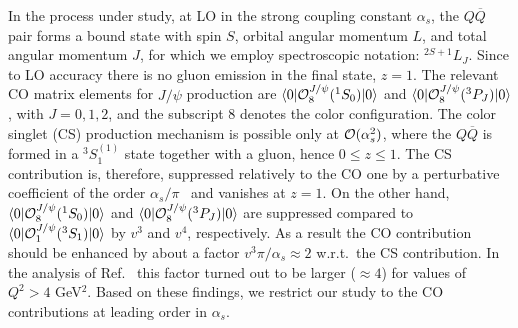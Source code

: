 \documentclass[prd,aps,preprintnumbers,nofootinbib,superscriptaddress]{revtex4}
\begin{document}
In the process under study, at LO in the strong coupling constant $\alpha_s$,  the $Q \overline Q$ pair forms a bound state with  spin $S$, orbital angular momentum $L$, and total angular momentum $J$, for which we employ spectroscopic notation: $^{2S+1}L_J$. Since to LO accuracy there is no gluon emission in the final state, $z=1$. The relevant CO matrix elements for $J/\psi$ production are  $\langle 0 \vert {\cal O}_8^{J/\psi} (^1 S_0)\vert 0 \rangle$ and $\langle 0 \vert {\cal O}_8^{J/\psi} (^3 P_J)\vert 0 \rangle$, with $J=0,1,2$, and the subscript $8$ denotes the color configuration. The color singlet (CS) production mechanism is possible only at ${\cal O}(\alpha_s^2)$, where the $Q \overline Q$ is formed in a $^3S_1^{(1)}$ state together with a gluon, hence $0 \le z \le 1$. The CS contribution is, therefore, suppressed relatively to the CO one by a perturbative coefficient of the order $\alpha_s/\pi$~\cite{Fleming:1997fq,Qiu:2020xum} and vanishes at $z=1$. On the other hand, $\langle 0 \vert {\cal O}_8^{J/\psi} (^1 S_0)\vert 0 \rangle$ and $\langle 0 \vert {\cal O}_8^{J/\psi} (^3 P_J)\vert 0 \rangle$ are suppressed compared to $\langle 0 \vert {\cal O}_1^{J/\psi} (^3 S_1)\vert 0 \rangle$ by $v^3$ and $v^4$,  respectively.  As a result the CO contribution should be enhanced by about a factor $v^3 \pi/\alpha_s \approx 2$ w.r.t.\ the CS contribution. In the analysis of Ref.~\cite{Fleming:1997fq} this factor turned out to be larger ($\approx 4$) for values of  $Q^2 > 4$ GeV$^2$. Based on these findings, we restrict our study to the CO contributions at leading order in $\alpha_s$.
\end{document}
